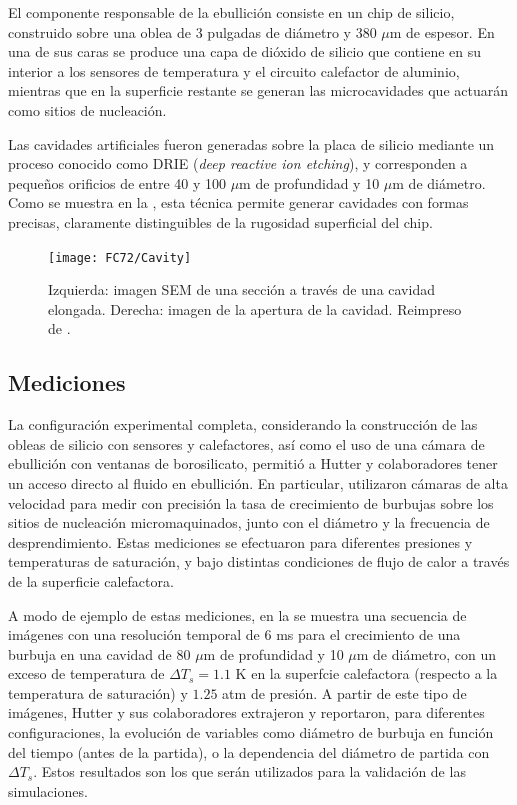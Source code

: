 El componente responsable de la ebullici\'on consiste en un chip de silicio, construido sobre una oblea de 3 pulgadas de di\'ametro y 380 $\mu$m de espesor. En una de sus caras se produce una capa de di\'oxido de silicio que contiene en su interior a los sensores de temperatura y el circuito calefactor de aluminio, mientras que en la superficie restante se generan las microcavidades que actuar\'an como sitios de nucleaci\'on.

Las cavidades artificiales fueron generadas sobre la placa de silicio mediante un proceso conocido como DRIE (\emph{deep reactive ion etching}), y corresponden a peque\~nos orificios de entre 40 y 100 $\mu$m de profundidad y 10 $\mu$m de di\'ametro. Como se muestra en la , esta t\'ecnica permite generar cavidades con formas precisas, claramente distinguibles de la rugosidad superficial del chip.

\begin{figure}[ht]
	\centering
	\texttt{[image: FC72/Cavity]}
	\caption{Izquierda: imagen SEM de una secci\'on a trav\'es de una cavidad elongada. Derecha: imagen de la apertura de la cavidad. Reimpreso de \cite{hutter_experimental_2010}.}
	\label{fig:cavidad}
\end{figure}


\subsection{Mediciones}

La configuraci\'on experimental completa, considerando la construcci\'on de las obleas de silicio con sensores y calefactores, as\'i como el uso de una c\'amara de ebullici\'on con ventanas de borosilicato, permiti\'o a Hutter y colaboradores tener un acceso directo al fluido en ebullici\'on. En particular, utilizaron c\'amaras de alta velocidad para medir con precisi\'on la tasa de crecimiento de burbujas sobre los sitios de nucleaci\'on micromaquinados, junto con el di\'ametro y la frecuencia de desprendimiento. Estas mediciones se efectuaron para diferentes presiones y temperaturas de saturaci\'on, y bajo distintas condiciones de flujo de calor a trav\'es de la superficie calefactora.

A modo de ejemplo de estas mediciones, en la  se muestra una secuencia de im\'agenes con una resoluci\'on temporal de 6 ms para el crecimiento de una burbuja en una cavidad de 80 $\mu$m de profundidad y 10 $\mu$m de di\'ametro, con un exceso de temperatura de $\Delta T_s = 1.1$ K en la superfcie calefactora (respecto a la temperatura de saturaci\'on) y $1.25$ atm de presi\'on. A partir de este tipo de im\'agenes, Hutter y sus colaboradores extrajeron y reportaron, para diferentes configuraciones, la evoluci\'on de variables como di\'ametro de burbuja en funci\'on del tiempo (antes de la partida), o la dependencia del di\'ametro de partida con $\Delta T_s$. Estos resultados son los que ser\'an utilizados para la validaci\'on de las simulaciones.

